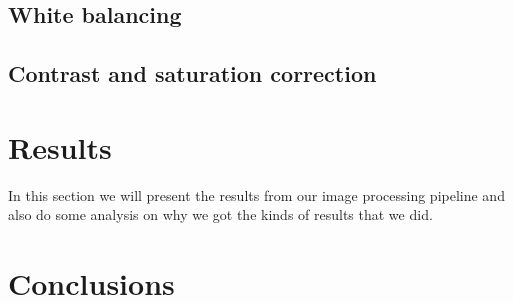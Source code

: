 \documentclass[12pt,a4paper,english
]{tunithesis}
\begin{document}
\section{White balancing}

\section{Contrast and saturation correction}



\chapter{Results}
\label{sec:results}
In this section we will present the results from our image processing pipeline and also do some analysis on why we got the kinds of results that we did.

\chapter{Conclusions}
\label{ch:conclusions}

%
%
\newpage

\printbibliography[title=References]
\end{document}

